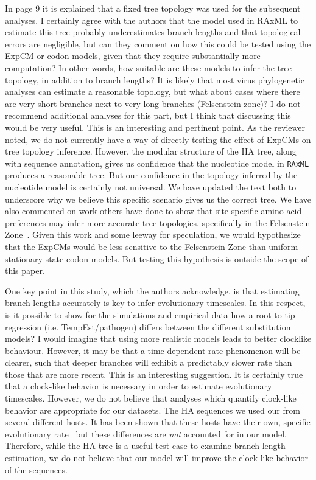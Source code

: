 \documentclass[11pt, oneside]{article}   	%
\newcommand{\response}[1]{{\color{black}#1}}
\begin{document}
In page 9 it is explained that a fixed tree topology was used for the subsequent analyses. 
I certainly agree with the authors that the model used in RAxML to estimate this tree probably underestimates branch lengths and that topological errors are negligible, but can they comment on how this could be tested using the ExpCM or codon models, given that they require substantially more computation? 
In other words, how suitable are these models to infer the tree topology, in addition to branch lengths? 
It is likely that most virus phylogenetic analyses can estimate a reasonable topology, but what about cases where there are very short branches next to very long branches (Felsenstein zone)? 
I do not recommend additional analyses for this part, but I think that discussing this would be very useful. 
\response{This is an interesting and pertinent point. 
As the reviewer noted, we do not currently have a way of directly testing the effect of ExpCMs on tree topology inference. 
However, the modular structure of the HA tree, along with sequence annotation, gives us confidence that the nucleotide model in \texttt{RAxML} produces a reasonable tree. 
But our confidence in the topology inferred by the nucleotide model is certainly not universal. 
We have updated the text both to underscore why we believe this specific scenario gives us the correct tree. 
We have also commented on work others have done to show that site-specific amino-acid preferences may infer more accurate tree topologies, specifically in the Felsenstein Zone~\citep{lartillot2007suppression}. 
Given this work and some leeway for speculation, we would hypothesize that the ExpCMs would be less sensitive to the Felsenstein Zone than uniform stationary state codon models.
But testing this hypothesis is outside the scope of this paper. 
}

One key point in this study, which the authors acknowledge, is that estimating branch lengths accurately is key to infer evolutionary timescales. 
In this respect, is it possible to show for the simulations and empirical data how a root-to-tip regression (i.e. TempEst/pathogen) differs between the different substitution models? 
I would imagine that using more realistic models leads to better clocklike behaviour. 
However, it may be that a time-dependent rate phenomenon will be clearer, such that deeper branches will exhibit a predictably slower rate than those that are more recent. 
\response{This is an interesting suggestion. 
It is certainly true that a clock-like behavior is necessary in order to estimate evolutionary timescales. 
However, we do not believe that analyses which quantify clock-like behavior are appropriate for our datasets. 
The HA sequences we used our from several different hosts. 
It has been shown that these hosts have their own, specific evolutionary rate~\citep{worobey2014synchronized} but these differences are \textit{not} accounted for in our model. 
Therefore, while the HA tree is a useful test case to examine branch length estimation, we do not believe that our model will improve the clock-like behavior of the sequences. 
}
\end{document}

